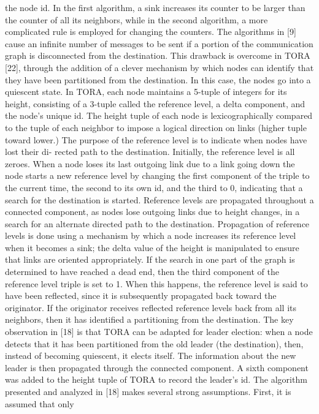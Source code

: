 the node id. In the first algorithm, a sink increases its counter to be larger than the
counter of all its neighbors, while in the second algorithm, a more complicated rule
is employed for changing the counters.
The algorithms in [9] cause an infinite number of messages to be sent if a portion
of the communication graph is disconnected from the destination. This drawback is
overcome in TORA [22], through the addition of a clever mechanism by which nodes
can identify that they have been partitioned from the destination. In this case, the
nodes go into a quiescent state.
In TORA, each node maintains a 5-tuple of integers for its height, consisting of a
3-tuple called the reference level, a delta component, and the node’s unique id. The
height tuple of each node is lexicographically compared to the tuple of each neighbor
to impose a logical direction on links (higher tuple toward lower.)
The purpose of the reference level is to indicate when nodes have lost their di-
rected path to the destination. Initially, the reference level is all zeroes. When a node
loses its last outgoing link due to a link going down the node starts a new reference
level by changing the first component of the triple to the current time, the second to
its own id, and the third to 0, indicating that a search for the destination is started.
Reference levels are propagated throughout a connected component, as nodes lose
outgoing links due to height changes, in a search for an alternate directed path to the
destination. Propagation of reference levels is done using a mechanism by which a
node increases its reference level when it becomes a sink; the delta value of the height
is manipulated to ensure that links are oriented appropriately. If the search in one part
of the graph is determined to have reached a dead end, then the third component of
the reference level triple is set to 1. When this happens, the reference level is said to
have been reflected, since it is subsequently propagated back toward the originator. If
the originator receives reflected reference levels back from all its neighbors, then it
has identified a partitioning from the destination.
The key observation in [18] is that TORA can be adapted for leader election:
when a node detects that it has been partitioned from the old leader (the destination),
then, instead of becoming quiescent, it elects itself. The information about the new
leader is then propagated through the connected component. A sixth component was
added to the height tuple of TORA to record the leader’s id. The algorithm presented
and analyzed in [18] makes several strong assumptions. First, it is assumed that only

